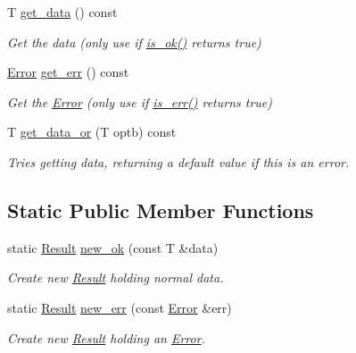 \begin{DoxyCompactItemize}
\mbox{\label{classnta_1_1Result_a96baacea35085048d694279d5de8c82e}} 
T \hyperlink{classnta_1_1Result_a96baacea35085048d694279d5de8c82e}{get\+\_\+data} () const
\begin{DoxyCompactList}\small\item\em Get the data (only use if \hyperlink{classnta_1_1Result_a61deaa087694eae4fdaece2996fedda0}{is\+\_\+ok()} returns true) \end{DoxyCompactList}\item 
\mbox{\label{classnta_1_1Result_a9ea9717e77d5e9a2371eb3cf9c896bc7}} 
\hyperlink{structnta_1_1Error}{Error} \hyperlink{classnta_1_1Result_a9ea9717e77d5e9a2371eb3cf9c896bc7}{get\+\_\+err} () const
\begin{DoxyCompactList}\small\item\em Get the \hyperlink{structnta_1_1Error}{Error} (only use if \hyperlink{classnta_1_1Result_ab742b047f1e670bc6a374f32c3fd48ea}{is\+\_\+err()} returns true) \end{DoxyCompactList}\item 
\mbox{\label{classnta_1_1Result_ae5fb7648fc0ecfbab99404a97fb27c83}} 
T \hyperlink{classnta_1_1Result_ae5fb7648fc0ecfbab99404a97fb27c83}{get\+\_\+data\+\_\+or} (T optb) const
\begin{DoxyCompactList}\small\item\em Tries getting data, returning a default value if this is an error. \end{DoxyCompactList}\end{DoxyCompactItemize}
\subsection*{Static Public Member Functions}
\begin{DoxyCompactItemize}
\item 
\mbox{\label{classnta_1_1Result_af193a336ab789de94a975c6f0a039e40}} 
static \hyperlink{classnta_1_1Result}{Result} \hyperlink{classnta_1_1Result_af193a336ab789de94a975c6f0a039e40}{new\+\_\+ok} (const T \&data)
\begin{DoxyCompactList}\small\item\em Create new \hyperlink{classnta_1_1Result}{Result} holding normal data. \end{DoxyCompactList}\item 
\mbox{\label{classnta_1_1Result_ad65a9140ae2a03cfb13bd30f848b1aa5}} 
static \hyperlink{classnta_1_1Result}{Result} \hyperlink{classnta_1_1Result_ad65a9140ae2a03cfb13bd30f848b1aa5}{new\+\_\+err} (const \hyperlink{structnta_1_1Error}{Error} \&err)
\begin{DoxyCompactList}\small\item\em Create new \hyperlink{classnta_1_1Result}{Result} holding an \hyperlink{structnta_1_1Error}{Error}. \end{DoxyCompactList}\end{DoxyCompactItemize}
